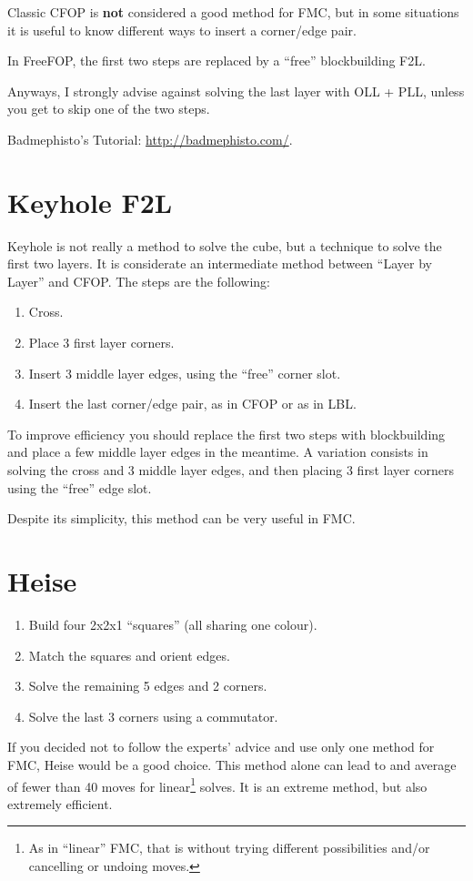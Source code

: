 \documentclass[11pt,a4paper]{book}
\begin{document}
Classic CFOP is \textbf{not} considered a good method for FMC, but in some situations it is useful to know different ways to insert a corner/edge pair.

In FreeFOP, the first two steps are replaced by a ``free'' blockbuilding F2L.

Anyways, I strongly advise against solving the last layer with OLL + PLL, unless you get to skip one of the two steps.

Badmephisto's Tutorial: \url{http://badmephisto.com/}.

\section{Keyhole F2L}

Keyhole is not really a method to solve the cube, but a technique to solve the first two layers. It is considerate an intermediate method between “Layer by Layer” and CFOP. The steps are the following:
\begin{enumerate}
\item Cross.
\item Place 3 first layer corners.
\item Insert 3 middle layer edges, using the ``free'' corner slot.
\item Insert the last corner/edge pair, as in CFOP or as in LBL.
\end{enumerate}

To improve efficiency you should replace the first two steps with blockbuilding and place a few middle layer edges in the meantime. A variation consists in solving the cross and 3 middle layer edges, and then placing 3 first layer corners using the ``free'' edge slot.

Despite its simplicity, this method can be very useful in FMC.

\section{Heise}
\begin{enumerate}
\item Build four 2x2x1 ``squares'' (all sharing one colour).
\item Match the squares and orient edges.
\item Solve the remaining 5 edges and 2 corners.
\item Solve the last 3 corners using a commutator.
\end{enumerate}

If you decided not to follow the experts' advice and use only one method for FMC, Heise would be a good choice. This method alone can lead to and average of fewer than 40 moves for linear\footnote{As in ``linear'' FMC, that is without trying different possibilities and/or cancelling or undoing moves.} solves. It is an extreme method, but also extremely efficient.
\end{document}
